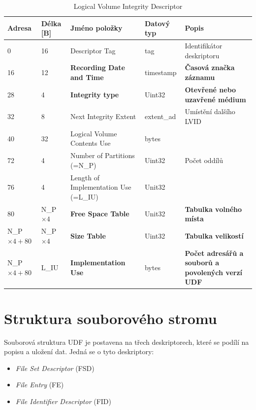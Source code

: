 \begin{table}[]
    \centering
    \begin{tabular}{ | l | l | p{3.7cm} | p{1.8cm} | p{4.2cm} | }
        \hline
        Adresa  & Délka [B]   & Jméno položky & Datový typ    & Popis \\ \hline\hline
        0   &16             & Descriptor Tag                    & tag           & Identifikátor deskriptoru \\ \hline
        16  &12             & \textbf{Recording Date and Time}  & timestamp     & \textbf{Časová značka záznamu} \\ \hline
        28  &4              & \textbf{Integrity type}           & Uint32        & \textbf{Otevřené nebo uzavřené médium} \\ \hline
        32  &8              & Next Integrity Extent             & extent\_ad    & Umístění dalšího LVID \\ \hline
        40  &32             & Logical Volume Contents Use       & bytes         &  \\ \hline
        72  &4              & Number of Partitions (=N\_P)      & Uint32        & Počet oddílů \\ \hline
        76  &4              & Length of Implementation Use (=L\_IU)& Unit32     &  \\ \hline
        80  &N\_P$\times4$  & \textbf{Free Space Table}         & Unit32        & \textbf{Tabulka volného místa} \\ \hline
        N\_P$\times4+80$ &N\_P$\times4$& \textbf{Size Table}    & Uint32        & \textbf{Tabulka velikostí} \\ \hline
        N\_P$\times4+80$ &L\_IU& \textbf{Implementation Use}    & bytes         & \textbf{Počet adresářů a souborů a povolených verzí UDF} \\ \hline
    \end{tabular}
    \caption{Logical Volume Integrity Descriptor\label{tab:lvid}}
\end{table}

\section{Struktura souborového stromu}
\label{sec:file-structure}
Souborová struktura UDF je postavena na třech deskriptorech, které se podílí na popisu a uložení dat. Jedná se o tyto deskriptory:
\begin{itemize}
    \item \textit{File Set Descriptor} (FSD)
    \item \textit{File Entry} (FE)
    \item \textit{File Identifier Descriptor} (FID)
\end{itemize}

